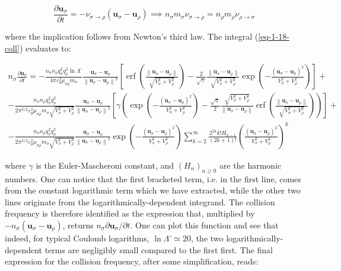 \begin{equation}
    \label{eq-1-20-coll}
    \frac{\partial \mathbf{u}_\sigma}{\partial t}=-\nu_{\sigma\to\rho}\left(\mathbf{u}_\sigma-\mathbf{u}_\rho\right)\implies n_\sigma m_\sigma\nu_{\sigma\to\rho}= n_\rho m_\rho\nu_{\rho\to\sigma}
\end{equation}

where the implication follows from Newton's third law. The integral (\ref{eq-1-18-coll}) evaluates to:

\begin{gather*}
    n_\sigma \frac{\partial \mathbf{u}_\sigma}{\partial t}=-\frac{n_\sigma n_\rho q_\sigma^2 q_\rho^2\ln{\Lambda^\square}}{4\pi \varepsilon_0^2\mu_{\sigma\rho}m_\sigma}\frac{\mathbf{u}_{\sigma}-\mathbf{u}_\rho}{\left\|\mathbf{u}_\sigma-\mathbf{u}_\rho\right\|^3}\left[\operatorname{erf}{\left(\frac{\left\|\mathbf{u}_\sigma-\mathbf{u}_\rho\right\|}{\sqrt{V_\sigma^2+V_\rho^2}}\right)}-\frac{2}{\sqrt{\pi}}\frac{\left\|\mathbf{u}_\sigma-\mathbf{u}_\rho\right\|}{\sqrt{V_\sigma^2+V_\rho^2}}\exp{\left(-\frac{\left(\mathbf{u}_\sigma-\mathbf{u}_\rho\right)^2}{V_\sigma^2+V_\rho^2}\right)}\right]+\\
-\frac{n_\sigma n_\rho q_\sigma^2 q_\rho^2}{2\pi^{3/2} \varepsilon_0^2\mu_{\sigma\rho}m_\sigma\sqrt{V_\sigma^2+V_\rho^2}}\frac{\mathbf{u}_\sigma-\mathbf{u}_\rho}{\left\|\mathbf{u}_\sigma-\mathbf{u}_\rho\right\|^2}\left[\gamma \left(\exp{\left(-\frac{\left(\mathbf{u}_\sigma-\mathbf{u}_\rho\right)^2}{V_\sigma^2+V_\rho^2}\right)}-\frac{\sqrt{\pi}}{2}\frac{\sqrt{V_\sigma^2+V_\rho^2}}{\left\|\mathbf{u}_\sigma-\mathbf{u}_\rho\right\|}\operatorname{erf}{\left(\frac{\left\|\mathbf{u}_\sigma-\mathbf{u}_\rho\right\|}{\sqrt{V_\sigma^2+V_\rho^2}}\right)}\right)\right]+\\
-\frac{n_\sigma n_\rho q_\sigma^2 q_\rho^2}{2\pi^{3/2}\varepsilon_0^2\mu_{\sigma\rho} m_\sigma\sqrt{V_\sigma^2+V_\rho^2}}\frac{\mathbf{u}_\sigma-\mathbf{u}_\rho}{\left\|\mathbf{u}_\sigma-\mathbf{u}_\rho\right\|^2}\exp{\left(-\frac{\left(\mathbf{u}_\sigma-\mathbf{u}_\rho\right)^2}{V_\sigma^2+V_\rho^2}\right)}\sum_{k=2}^\infty \frac{2^{2k}k!H_{k-1}}{(2k+1)!}\left(\frac{\left(\mathbf{u}_\sigma-\mathbf{u}_\rho\right)^2}{V_\sigma^2+V_\rho^2}\right)^{k}
\end{gather*}

where $\gamma$ is the Euler-Mascheroni constant, and $(H_n)_{n\geq0}$ are the harmonic numbers. One can notice that the first bracketed term, i.e. in the first line, comes from the constant logarithmic term which we have extracted, while the other two lines originate from the logarithmically-dependent integrand. The collision frequency is therefore identified as the expression that, multiplied by $-n_\sigma \left(\mathbf{u}_\sigma-\mathbf{u}_\rho\right)$, returns $n_\sigma{\partial \mathbf{u}_\sigma}/{\partial t}$. One can plot this function and see that indeed, for typical Coulomb logarithms, $\ln{\Lambda^\square}\simeq20$, the two logarithmically-dependent terms are negligibly small compared to the first first. The final expression for the collision frequency, after some simplification, reads:

